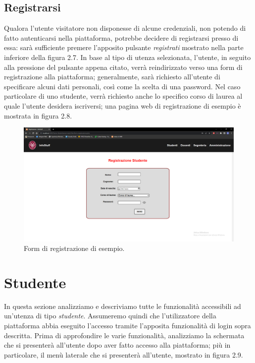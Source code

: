 \documentclass [a4paper,11pt]{book}
\begin{document}
\medskip

\subsection{Registrarsi}

Qualora l'utente visitatore non disponesse di alcune credenziali, non potendo di fatto autenticarsi nella piattaforma, potrebbe decidere di registrarsi presso di essa: sarà sufficiente premere l'apposito pulsante \emph{registrati} mostrato nella parte inferiore della figura 2.7. In base al tipo di utenza selezionata, l'utente, in seguito alla pressione del pulsante appena citato, verrà reindirizzato verso una form di registrazione alla piattaforma; generalmente, sarà richiesto all'utente di specificare alcuni dati personali, così come la scelta di una password. Nel caso particolare di uno studente, verrà richiesto anche lo specifico corso di laurea al quale l'utente desidera iscriversi; una pagina web di registrazione di esempio è mostrata in figura 2.8.

\begin{figure}
\centering
\includegraphics[scale=0.3]{figura2-8.png}
\caption{Form di registrazione di esempio.}
\end{figure}

\medskip
\medskip

\section{Studente}

In questa sezione analizziamo e descriviamo tutte le funzionalità accessibili ad un'utenza di tipo \emph{studente}. Assumeremo quindi che l'utilizzatore della piattaforma abbia eseguito l'accesso tramite l'apposita funzionalità di login sopra descritta. Prima di approfondire le varie funzionalità, analizziamo la schermata che si presenterà all'utente dopo aver fatto accesso alla piattaforma; più in particolare, il menù laterale che si presenterà all'utente, mostrato in figura 2.9.
\end{document}
